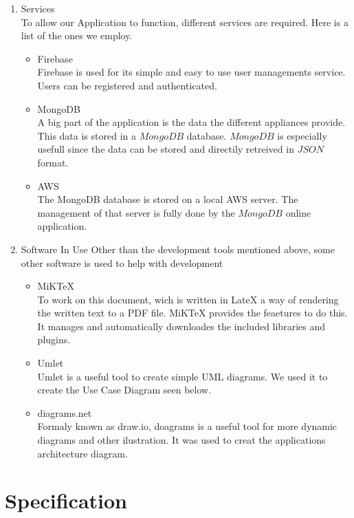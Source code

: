 \documentclass[10pt]{article}
\begin{document}
\begin{multicols*}{2}
\begin{enumerate}
  \item {Services} \\
  To allow our Application to function, different services are required. Here is a list of the ones we employ.
  \begin{itemize}
    \item {Firebase} \\
    Firebase is used for its simple and easy to use user managements service. Users can be registered and authenticated.
    \item {MongoDB} \\
    A big part of the application is the data the different appliances provide. This data is stored in a $MongoDB$ database. $MongoDB$ is especially usefull since the data can be stored and directily retreived in $JSON$ format.
    \item {AWS} \\
    The MongoDB database is stored on a local AWS server. The management of that server is fully done by the $MongoDB$ online application.
  \end{itemize}

  \item {Software In Use}
  Other than the development tools mentioned above, some other software is used to help with development
  \begin{itemize}
    \item {MiKTeX} \\
    To work on this document, wich is written in LateX a way of rendering the written text to a PDF file. MiKTeX provides the feaetures to do this. It manages and automatically downloades the included libraries and plugins.
    \item {Umlet} \\
    Umlet is a useful tool to create simple UML diagrams. We used it to create the Use Case Diagram seen below.
    \item {diagrams.net} \\
    Formaly known as draw.io, doagrams is a useful tool for more dynamic diagrams and other ilustration. It was used to creat the applications architecture diagram.
    
  \end{itemize}
\end{enumerate}

\clearpage

\section{Specification}


\end{multicols*}
\end{document}
